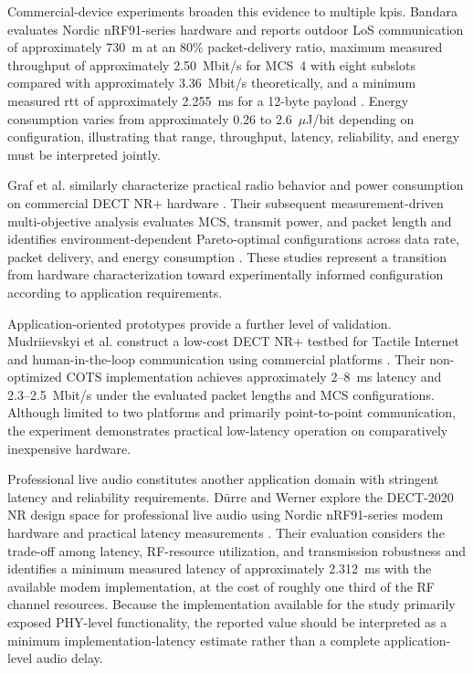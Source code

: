 Commercial-device experiments broaden this evidence to multiple \glspl{kpi}. Bandara evaluates Nordic nRF91-series hardware and reports outdoor LoS communication of approximately 730~m at an 80\% packet-delivery ratio, maximum measured throughput of approximately 2.50~Mbit/s for MCS~4 with eight subslots compared with approximately 3.36~Mbit/s theoretically, and a minimum measured \gls{rtt} of approximately 2.255~ms for a 12-byte payload \cite{bandaraExperimentalValidationAnalysis2025}. Energy consumption varies from approximately 0.26 to 2.6~$\mu$J/bit depending on configuration, illustrating that range, throughput, latency, reliability, and energy must be interpreted jointly.

Graf et al. similarly characterize practical radio behavior and power consumption on commercial DECT NR+ hardware \cite{grafWhatExpectWhen2026}. Their subsequent measurement-driven multi-objective analysis evaluates MCS, transmit power, and packet length and identifies environment-dependent Pareto-optimal configurations across data rate, packet delivery, and energy consumption \cite{grafParetoOptimalityApproach2026a}. These studies represent a transition from hardware characterization toward experimentally informed configuration according to application requirements.

Application-oriented prototypes provide a further level of validation. Mudriievskyi et al. construct a low-cost DECT NR+ testbed for Tactile Internet and human-in-the-loop communication using commercial platforms \cite{mudriievskyiCHEAP5GDECT2024a}. Their non-optimized COTS implementation achieves approximately 2--8~ms latency and 2.3--2.5~Mbit/s under the evaluated packet lengths and MCS configurations. Although limited to two platforms and primarily point-to-point communication, the experiment demonstrates practical low-latency operation on comparatively inexpensive hardware.

Professional live audio constitutes another application domain with stringent latency and reliability requirements. D{\"u}rre and Werner explore the DECT-2020 NR design space for professional live audio using Nordic nRF91-series modem hardware and practical latency measurements \cite{durreDECT2020NRProfessional2024}. Their evaluation considers the trade-off among latency, RF-resource utilization, and transmission robustness and identifies a minimum measured latency of approximately 2.312~ms with the available modem implementation, at the cost of roughly one third of the RF channel resources. Because the implementation available for the study primarily exposed PHY-level functionality, the reported value should be interpreted as a minimum implementation-latency estimate rather than a complete application-level audio delay.

